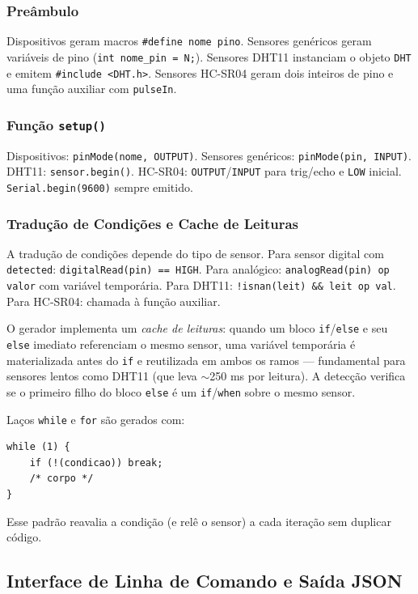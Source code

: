 \documentclass[conference]{IEEEtran}
\begin{document}
\subsubsection{Preâmbulo}
Dispositivos geram macros \texttt{\#define nome pino}. Sensores genéricos
geram variáveis de pino (\texttt{int nome\_pin = N;}). Sensores DHT11
instanciam o objeto \texttt{DHT} e emitem \texttt{\#include <DHT.h>}. Sensores
HC-SR04 geram dois inteiros de pino e uma função auxiliar com \texttt{pulseIn}.

\subsubsection{Função \texttt{setup()}}
Dispositivos: \texttt{pinMode(nome, OUTPUT)}. Sensores genéricos:
\texttt{pinMode(pin, INPUT)}. DHT11: \texttt{sensor.begin()}. HC-SR04:
\texttt{OUTPUT}/\texttt{INPUT} para trig/echo e \texttt{LOW} inicial.
\texttt{Serial.begin(9600)} sempre emitido.

\subsubsection{Tradução de Condições e Cache de Leituras}
A tradução de condições depende do tipo de sensor. Para sensor digital com
\texttt{detected}: \texttt{digitalRead(pin) == HIGH}. Para analógico:
\texttt{analogRead(pin) op valor} com variável temporária. Para DHT11:
\texttt{!isnan(leit) \&\& leit op val}. Para HC-SR04: chamada à função
auxiliar.

O gerador implementa um \emph{cache de leituras}: quando um bloco
\texttt{if}/\texttt{else} e seu \texttt{else} imediato referenciam o mesmo
sensor, uma variável temporária é materializada antes do \texttt{if} e
reutilizada em ambos os ramos — fundamental para sensores lentos como DHT11
(que leva $\sim$250 ms por leitura). A detecção verifica se o primeiro filho
do bloco \texttt{else} é um \texttt{if}/\texttt{when} sobre o mesmo sensor.

Laços \texttt{while} e \texttt{for} são gerados com:
\begin{lstlisting}[style=csmall]
while (1) {
    if (!(condicao)) break;
    /* corpo */
}
\end{lstlisting}
Esse padrão reavalia a condição (e relê o sensor) a cada iteração sem
duplicar código.

\subsection{Interface de Linha de Comando e Saída JSON}
\end{document}
